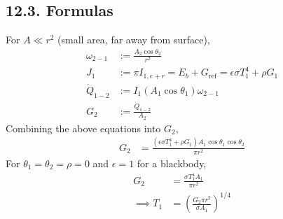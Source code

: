 \begin{multicols*}{2}
\subsection*{12.3. Formulas}
For $A \ll r^2$ (small area, far away from surface),
\begin{align*}
    \omega_{2-1} &:= \frac{A_2 \cos\theta_2}{r^2}\\
    J_1 &:= \pi I_{1, e+r} = E_b + G_{\text{ref}} = \epsilon\sigma T_{1}^4  + \rho G_{1} \\ 
    \dot{Q}_{1-2} &:= I_1 (A_1 \cos\theta_1) \omega_{2-1} \\
    G_2 &:= \frac{\dot{Q}_{1-2}}{A_2} 
\end{align*}
Combining the above equations into $G_2$,
\begin{align*}
    G_2 &= \frac{(\epsilon\sigma T_{1}^4  + \rho G_{\text{1}})A_1 \cos\theta_1 \cos\theta_2}{\pi r^2} 
\end{align*}
For $\theta_1 = \theta_2 = \rho = 0$ and $\epsilon = 1$ for a blackbody,
\begin{align*}
    G_2 &= \frac{\sigma T_{1}^4 A_1}{\pi r^2} \\
    \implies T_{1} &= \left(\frac{G_2 \pi r^2}{\sigma A_1}\right)^{1/4}
\end{align*}

\end{multicols*}